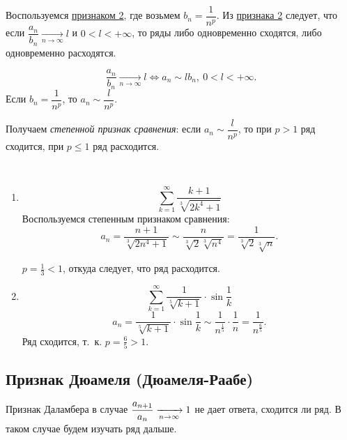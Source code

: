\documentclass[../../main.tex]{subfiles}
\begin{document}
		Воспользуемся \hyperref[lec26:comp_test_2]{признаком 2\textdegree}, где 
		возьмем $b_n = \dfrac{1}{n^p}$. Из 
		\hyperref[lec26:comp_test_2]{признака 2\textdegree} следует, что если 
		$\dfrac{a_n}{b_n} \underset{n 
		\rightarrow \infty} {\longrightarrow} l $ и $0 < l < +\infty$, то ряды 
		либо одновременно сходятся, либо одновременно расходятся.
		
		\[\dfrac{a_n}{b_n} \underset{n \rightarrow \infty} {\longrightarrow} l \iff 
		a_n 
		\sim l b_n,\ 0 < l < +\infty.\] Если $b_n = \dfrac{1}{n^p}$, то $a_n \sim 
		\dfrac{l}{n^p}$.
		
		Получаем \emph{степенной признак сравнения}:
		если $a_n \sim \dfrac{l}{n^p}$, то при $p>1$ ряд сходится, при $p \le 1$ ряд 
		расходится.

	\begin{examples}
		~
	\begin{enumerate}[label=\arabic*)]	
		\item \[ \sum_{k = 1}^{\infty} \frac{k+1}{\sqrt[3]{2k^4 + 1}}  \]
		Воспользуемся степенным признаком сравнения:
		\[ a_n = \frac{n+1}{\sqrt[3]{2n^4 + 1}} \sim \frac{n}{\sqrt[3]{2} 
		\sqrt[3]{n^4}} = \frac{1}{\sqrt[3]{2} \sqrt[3]{n}}. \]
		
		$p = \frac{1}{3} < 1$, откуда следует, что ряд расходится. 
		\item \[ \sum_{k=1}^{\infty} \frac{1}{\sqrt[5]{k+1}}\cdot \sin{\frac{1}{k}}  
		\]
		\[  a_n =  \frac{1}{\sqrt[5]{k+1}}\cdot \sin{\frac{1}{k}} \sim 
		\frac{1}{n^{\frac{1}{5}} } \cdot \frac{1}{n} =  \frac{1}{n^{\frac{6}{5}} }.  
		\]
		Ряд сходится, т.~к. $p = \frac{6}{5} > 1$.
	\end{enumerate}	
	\end{examples}	

	\subsection{Признак Дюамеля (Дюамеля-Раабе)}
	
	Признак Даламбера в случае $\dfrac{a_{n+1}}{a_n} \xrightarrow[n\to\infty]{} 1$ не дает 
	ответа, сходится ли ряд. В таком случае будем изучать ряд дальше.
	
\end{document}
